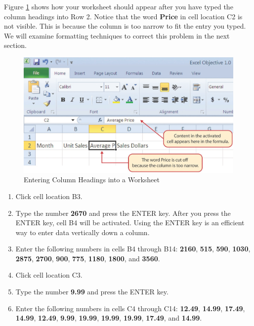 Figure \ref{01:fig15} shows how your worksheet should appear after you have typed the column headings into Row 2. Notice that the word \textbf{Price} in cell location \textsf{C2} is not visible. This is because the column is too narrow to fit the entry you typed. We will examine formatting techniques to correct this problem in the next section.

\begin{figure}[H]
	\centering
	\includegraphics[width=\maxwidth{.95\linewidth}]{gfx/Ch01_fig15}
	\caption{Entering Column Headings into a Worksheet}
	\label{01:fig15}
\end{figure}

\begin{enumerate}
	\item Click cell location \textsf{B3}.
	\item Type the number \textbf{2670} and press the ENTER key. After you press the ENTER key, cell \textsf{B4} will be activated. Using the ENTER key is an efficient way to enter data vertically down a column.
	\item Enter the following numbers in cells \textsf{B4} through \textsf{B14}: \textbf{2160}, \textbf{515}, \textbf{590}, \textbf{1030}, \textbf{2875}, \textbf{2700}, \textbf{900}, \textbf{775}, \textbf{1180}, \textbf{1800}, and \textbf{3560}.
	\item Click cell location \textsf{C3}.
	\item Type the number \textbf{9.99} and press the ENTER key.
	\item Enter the following numbers in cells \textsf{C4} through \textsf{C14}: \textbf{12.49}, \textbf{14.99}, \textbf{17.49}, \textbf{14.99}, \textbf{12.49}, \textbf{9.99}, \textbf{19.99}, \textbf{19.99}, \textbf{19.99}, \textbf{17.49}, and \textbf{14.99}.
\end{enumerate}

